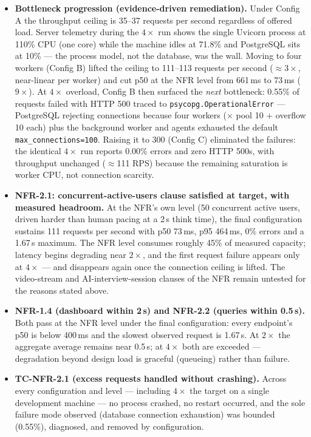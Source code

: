 \begin{itemize}
    \item \textbf{Bottleneck progression (evidence-driven remediation).} Under Config A the throughput ceiling is 35--37 requests per second regardless of offered load. Server telemetry during the $4\times$ run shows the single Uvicorn process at 110\% CPU (one core) while the machine idles at 71.8\% and PostgreSQL sits at 10\% --- the process model, not the database, was the wall. Moving to four workers (Config B) lifted the ceiling to 111--113 requests per second ($\approx 3\times$, near-linear per worker) and cut p50 at the NFR level from 661\,ms to 73\,ms ($9\times$). At $4\times$ overload, Config B then surfaced the \emph{next} bottleneck: 0.55\% of requests failed with HTTP 500 traced to \texttt{psycopg.OperationalError} --- PostgreSQL rejecting connections because four workers ($\times$ pool 10 + overflow 10 each) plus the background worker and agents exhausted the default \texttt{max\_connections=100}. Raising it to 300 (Config C) eliminated the failures: the identical $4\times$ run reports 0.00\% errors and zero HTTP 500s, with throughput unchanged ($\approx$111 RPS) because the remaining saturation is worker CPU, not connection scarcity.
    \item \textbf{NFR-2.1: concurrent-active-users clause satisfied at target, with measured headroom.} At the NFR's own level (50 concurrent active users, driven harder than human pacing at a 2\,s think time), the final configuration sustains 111 requests per second with p50 73\,ms, p95 464\,ms, 0\% errors and a 1.67\,s maximum. The NFR level consumes roughly 45\% of measured capacity; latency begins degrading near $2\times$, and the first request failure appears only at $4\times$ --- and disappears again once the connection ceiling is lifted. The video-stream and AI-interview-session clauses of the NFR remain untested for the reasons stated above.
    \item \textbf{NFR-1.4 (dashboard within 2\,s) and NFR-2.2 (queries within 0.5\,s).} Both pass at the NFR level under the final configuration: every endpoint's p50 is below 400\,ms and the slowest observed request is 1.67\,s. At $2\times$ the aggregate average remains near 0.5\,s; at $4\times$ both are exceeded --- degradation beyond design load is graceful (queueing) rather than failure.
    \item \textbf{TC-NFR-2.1 (excess requests handled without crashing).} Across every configuration and level --- including $4\times$ the target on a single development machine --- no process crashed, no restart occurred, and the sole failure mode observed (database connection exhaustion) was bounded (0.55\%), diagnosed, and removed by configuration.

\end{itemize}
